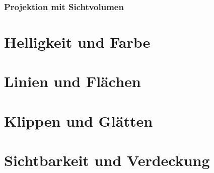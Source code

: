 \subsection{Projektion mit Sichtvolumen}


\chapter{Helligkeit und Farbe}
\chapter{Linien und Flächen}
\chapter{Klippen und Glätten}

\chapter{Sichtbarkeit und Verdeckung}



